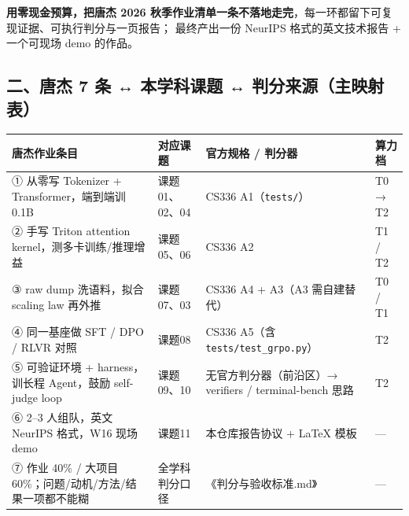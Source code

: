 \documentclass[
  chinese,
  11pt,
]{ctexart}
\newcounter{none} %
\begin{document}
\textbf{用零现金预算，把唐杰 2026 秋季作业清单一条不落地走完}，每一环都留下可复现证据、可执行判分与一页报告； 最终产出一份 NeurIPS 格式的英文技术报告 + 一个可现场 demo 的作品。

\subsection{二、唐杰 7 条 ↔ 本学科课题 ↔ 判分来源（主映射表）}\label{ux4e8cux5510ux6770-7-ux6761-ux672cux5b66ux79d1ux8bfeux9898-ux5224ux5206ux6765ux6e90ux4e3bux6620ux5c04ux8868}

{\def\LTcaptype{none} %
\begin{longtable}[]{@{}
  >{\raggedright\arraybackslash}p{}
  >{\raggedright\arraybackslash}p{}
  >{\raggedright\arraybackslash}p{}
  >{\raggedright\arraybackslash}p{}@{}}
\toprule\noalign{}
\begin{minipage}[b]{\linewidth}\raggedright
唐杰作业条目
\end{minipage} & \begin{minipage}[b]{\linewidth}\raggedright
对应课题
\end{minipage} & \begin{minipage}[b]{\linewidth}\raggedright
官方规格 / 判分器
\end{minipage} & \begin{minipage}[b]{\linewidth}\raggedright
算力档
\end{minipage} \\
\midrule\noalign{}
\endhead
\bottomrule\noalign{}
\endlastfoot
① 从零写 Tokenizer + Transformer，端到端训 0.1B & 课题01、02、04 & CS336 A1（\texttt{tests/}） & T0 → T2 \\
② 手写 Triton attention kernel，测多卡训练/推理增益 & 课题05、06 & CS336 A2 & T1 / T2 \\
③ raw dump 洗语料，拟合 scaling law 再外推 & 课题07、03 & CS336 A4 + A3（A3 需自建替代） & T0 / T1 \\
④ 同一基座做 SFT / DPO / RLVR 对照 & 课题08 & CS336 A5（含 \texttt{tests/test\_grpo.py}） & T2 \\
⑤ 可验证环境 + harness，训长程 Agent，鼓励 self-judge loop & 课题09、10 & 无官方判分器（前沿区）→ verifiers / terminal-bench 思路 & T2 \\
⑥ 2--3 人组队，英文 NeurIPS 格式，W16 现场 demo & 课题11 & 本仓库报告协议 + LaTeX 模板 & --- \\
⑦ 作业 40\% / 大项目 60\%；问题/动机/方法/结果一项都不能糊 & 全学科判分口径 & 《判分与验收标准.md》 & --- \\
\end{longtable}
}
\end{document}
